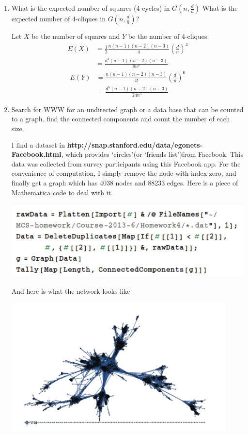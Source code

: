 \documentclass[a4paper, 12pt]{mcshw}
\begin{document}
\Letsmaketitle{}
\begin{enumerate}
    \item What is the expected number of squares (4-cycles) in $G(n, \frac{d}{n})$ What is the expected number of 4-cliques in $G(n, \frac{d}{n})$?
        \begin{solution}
            Let $X$ be the number of squares and $Y$ be the number of 4-cliques. 
            \begin{align*}
                E(X) &= \frac{1}{2}\frac{n(n - 1)(n - 2)(n - 3)}{4}(\frac{d}{n})^4\\
                &= \frac{d^4(n - 1)(n - 2)(n - 3)}{8n^3}
            \end{align*}
            \begin{align*}
                E(Y) &= \frac{n(n - 1)(n - 2)(n - 3)}{4!}(\frac{d}{n})^6\\
                &= \frac{d^6(n - 1)(n - 2)(n - 3)}{24n^5}
            \end{align*}
        \end{solution}
    \item Search for WWW for an undirected graph or a data base that can be counted to a graph. find the connected components and count the number of each size.
        \pagebreak
        \begin{solution}
            I find a dataset in \textbf{http://snap.stanford.edu/data/egonets-Facebook.html}, which provides `circles'(or `friends list')from Facebook.  This data was collected from survey participants using this Facebook app. For the convenience of computation, I simply remove the node with index zero, and finally get a graph which has 4038 nodes and 88233 edges.
            Here is a piece of Mathematica code to deal with it.
            \begin{center}
                \includegraphics[height=4cm]{1.png}
            \end{center}
            And here is what the network looks like
            \begin{center}
                \includegraphics[height=7cm]{2.png}

\end{center}
\end{solution}
\end{enumerate}
\end{document}
